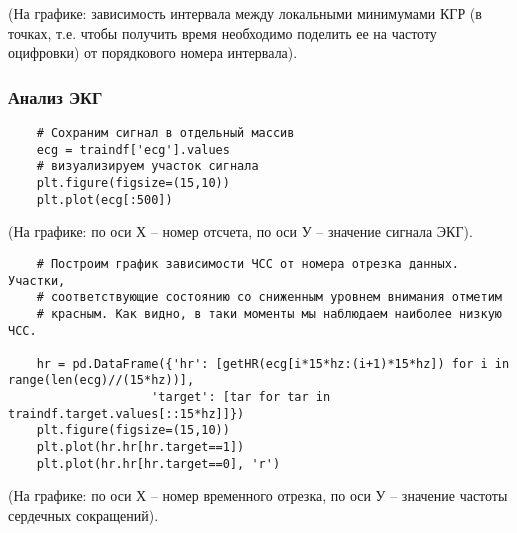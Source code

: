 
(На графике: зависимость интервала между локальными минимумами КГР (в точках, т.е. чтобы получить время необходимо поделить ее на частоту оцифровки) от порядкового номера интервала).

\subsubsection*{Анализ ЭКГ}

\begin{verbatim}
    # Сохраним сигнал в отдельный массив
    ecg = traindf['ecg'].values
    # визуализируем участок сигнала
    plt.figure(figsize=(15,10))
    plt.plot(ecg[:500])
\end{verbatim}


(На графике: по оси Х – номер отсчета, по оси У – значение сигнала ЭКГ).

\begin{verbatim}
    # Построим график зависимости ЧСС от номера отрезка данных. Участки,
    # соответствующие состоянию со сниженным уровнем внимания отметим
    # красным. Как видно, в таки моменты мы наблюдаем наиболее низкую ЧСС.

    hr = pd.DataFrame({'hr': [getHR(ecg[i*15*hz:(i+1)*15*hz]) for i in range(len(ecg)//(15*hz))],
                    'target': [tar for tar in traindf.target.values[::15*hz]]})
    plt.figure(figsize=(15,10))
    plt.plot(hr.hr[hr.target==1])
    plt.plot(hr.hr[hr.target==0], 'r')
\end{verbatim}


(На графике: по оси Х – номер временного отрезка, по оси У – значение частоты сердечных сокращений).
